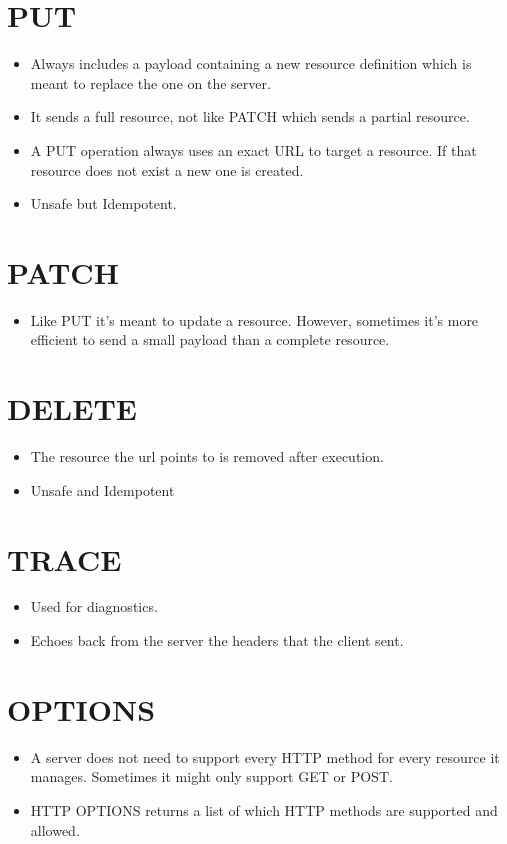 \section*{PUT}
\begin{itemize}
    \item Always includes a payload containing a new resource definition which is meant to replace the one on the server.
    \item It sends a full resource, not like PATCH which sends a partial resource.
    \item A PUT operation always uses an exact URL to target a resource. If that resource does not exist a new one is created.
    \item Unsafe but Idempotent.
\end{itemize}

\section*{PATCH}
\begin{itemize}
    \item Like PUT it's meant to update a resource. However, sometimes it's more efficient to send a small payload than a complete resource.
\end{itemize}

\section*{DELETE}
\begin{itemize}
    \item The resource the url points to is removed after execution.
    \item Unsafe and Idempotent
\end{itemize}

\section*{TRACE}
\begin{itemize}
    \item Used for diagnostics.
    \item Echoes back from the server the headers that the client sent.
\end{itemize}

\section*{OPTIONS}
\begin{itemize}
    \item A server does not need to support every HTTP method for every resource it manages. Sometimes it might only support GET or POST.
    \item HTTP OPTIONS returns a list of which HTTP methods are supported and allowed.
\end{itemize}